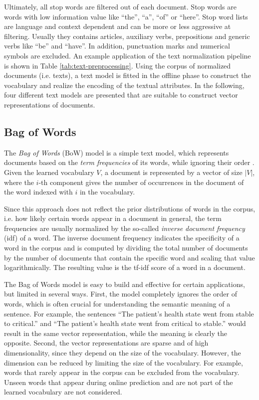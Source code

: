 Ultimately, all stop words are filtered out of each document.
Stop words are words with low information value like  \enquote{the},  \enquote{a},  \enquote{of} or  \enquote{here}.
Stop word lists are language and context dependent and can be more or less aggressive at filtering.
Usually they contains articles, auxiliary verbs, prepositions and generic verbs like  \enquote{be} and  \enquote{have}.
In addition, punctuation marks and numerical symbols are excluded.
An example application of the text normalization pipeline is shown in Table \ref{tab:text-preprocessing}.
Using the corpus of normalized documents (i.e. texts), a text model is fitted in the offline phase to construct the vocabulary and realize the encoding of the textual attributes.
In the following, four different text models are presented that are suitable to construct vector representations of documents.

\subsection{Bag of Words}\label{sec:bow}

The \textit{Bag of Words} (BoW) model is a simple text model, which represents documents based on the \textit{term frequencies} of its words, while ignoring their order \cite{harris1954distributional}.
Given the learned vocabulary $V$, a document is represented by a vector of size $|V|$, where the $i$-th component gives the number of occurrences in the document of the word indexed with $i$ in the vocabulary.

Since this approach does not reflect the prior distributions of words in the corpus, i.e. how likely certain words appear in a document in general, the term frequencies are usually normalized by the so-called \textit{inverse document frequency} (idf) of a word.
The inverse document frequency indicates the specificity of a word in the corpus and is computed by dividing the total number of documents by the number of documents that contain the specific word and scaling that value logarithmically.
The resulting value is the tf-idf score of a word in a document.

The Bag of Words model is easy to build and effective for certain applications, but limited in several ways.
First, the model completely ignores the order of words, which is often crucial for understanding the semantic meaning of a sentence. For example, the sentences  \enquote{The patient's health state went from stable to critical.} and  \enquote{The patient's health state went from critical to stable.} would result in the same vector representation, while the meaning is clearly the opposite.
Second, the vector representations are sparse and of high dimensionality, since they depend on the size of the vocabulary.
However, the dimension can be reduced by limiting the size of the vocabulary.
For example, words that rarely appear in the corpus can be excluded from the vocabulary.
Unseen words that appear during online prediction and are not part of the learned vocabulary are not considered.

